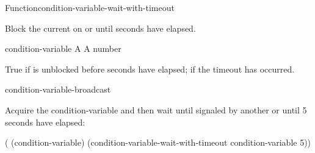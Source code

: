 \begin{functiondoc}{Function}{condition-variable-wait-with-timeout}%
  {
    \returns{} }

%

\fnsyntax

\fnpurpose Block the current  on  or until
 seconds have elapsed.

\fnpackage {}

\fnmodule {}

\fnargs
\begin{args}{condition-variable}
 A 
\arg[seconds] A number
\end{args}

\fnreturns True if  is unblocked before
 seconds have elapsed; \nil{} if the timeout has occurred.

\fnerrors
\nocvlock{}
\par
\nothreads{}

\begin{alsos}{condition-variable-broadcast}
\end{alsos}

%
\fnexample Acquire the condition-variable  and then wait until
signaled by another  or until 5 seconds have elapsed:
\begin{example}
  ( (condition-variable)
    (condition-variable-wait-with-timeout condition-variable 5))
\end{example}

\end{functiondoc}



